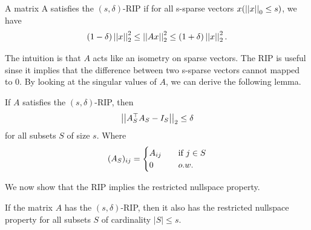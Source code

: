 \documentclass[11pt]{article}
\begin{document}
\begin{problem}
\begin{definition}
    A matrix A satisfies the \((s,\delta)\)-RIP if for all s-sparse vectors \(x(\left|\left|x\right|\right|_0 \leq s)\), we have
    \[(1 - \delta)\left|\left|x\right|\right|_2^2 \leq \left|\left|Ax\right|\right|^2_2 \leq (1 + \delta)\left|\left|x\right|\right|^2_2.\]
\end{definition}

The intuition is that \(A\) acts like an isometry on sparse vectors. The RIP is useful sinse it implies that the difference between two s-sparse vectors cannot mapped to 0. By looking at the singular values of \(A\), we can derive the following lemma.

\begin{lemma}
    If \(A\) satisfies the \((s,\delta)\)-RIP, then 
    \[\left|\left|A^\top_SA_S-I_S\right|\right|_2 \leq \delta\]
    for all subsets \(S\) of size \(s\). Where 
    \[(A_S)_{ij} = 
    \begin{cases}
        A_{ij} \quad &\textnormal{if } j \in S\\
        0 &o.w.
    \end{cases}
    \]
\end{lemma}

We now show that the RIP implies the restricted nullspace property.

\begin{theorem}
    If the matrix \(A\) has the \((s,\delta)\)-RIP, then it also has the restricted nullspace property for all subsets \(S\) of cardinality \(|S| \leq s\).
\end{theorem}


\end{problem}
\end{document}
